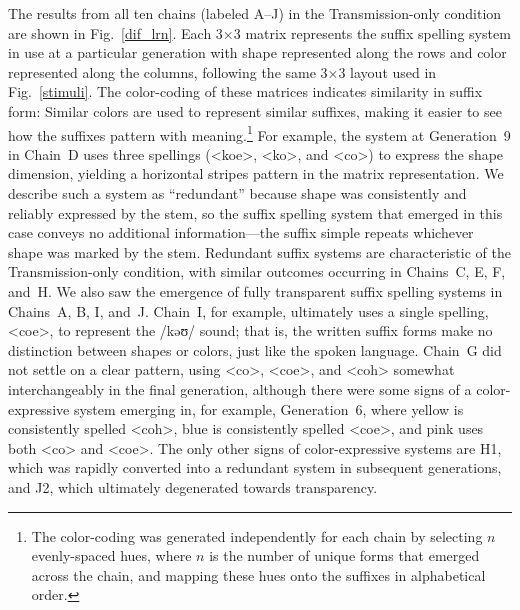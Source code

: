 \documentclass[doc,biblatex]{apa7}
\begin{document}
The results from all ten chains (labeled A--J) in the Transmission-only condition are shown in Fig.~\ref{dif_lrn}. Each 3×3 matrix represents the suffix spelling system in use at a particular generation with shape represented along the rows and color represented along the columns, following the same 3×3 layout used in Fig.~\ref{stimuli}. The color-coding of these matrices indicates similarity in suffix form: Similar colors are used to represent similar suffixes, making it easier to see how the suffixes pattern with meaning.\footnote{The color-coding was generated independently for each chain by selecting $n$ evenly-spaced hues, where $n$ is the number of unique forms that emerged across the chain, and mapping these hues onto the suffixes in alphabetical order.} For example, the system at Generation~9 in Chain~D uses three spellings (<koe>, <ko>, and <co>) to express the shape dimension, yielding a horizontal stripes pattern in the matrix representation. We describe such a system as ``redundant'' because shape was consistently and reliably expressed by the stem, so the suffix spelling system that emerged in this case conveys no additional information---the suffix simple repeats whichever shape was marked by the stem. Redundant suffix systems are characteristic of the Transmission-only condition, with similar outcomes occurring in Chains~C, E, F, and~H. We also saw the emergence of fully transparent suffix spelling systems in Chains~A, B, I, and~J. Chain~I, for example, ultimately uses a single spelling, <coe>, to represent the /kəʊ/ sound; that is, the written suffix forms make no distinction between shapes or colors, just like the spoken language. Chain~G did not settle on a clear pattern, using <co>, <coe>, and <coh> somewhat interchangeably in the final generation, although there were some signs of a color-expressive system emerging in, for example, Generation~6, where yellow is consistently spelled <coh>, blue is consistently spelled <coe>, and pink uses both <co> and <coe>. The only other signs of color-expressive systems are H1, which was rapidly converted into a redundant system in subsequent generations, and J2, which ultimately degenerated towards transparency.
\end{document}

